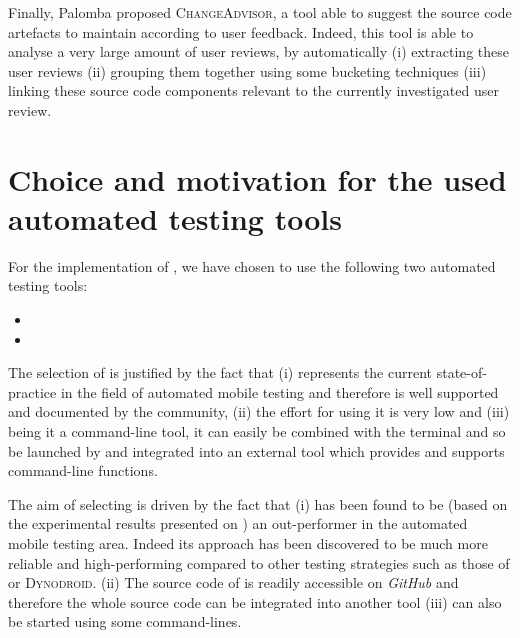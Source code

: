 Finally, Palomba \etal \cite{Palomba2017} proposed \textsc{ChangeAdvisor}, a tool able to suggest the source code artefacts to maintain according to user feedback.
Indeed, this tool is able to analyse a very large amount of user reviews, by automatically (i) extracting these user reviews (ii) grouping them together using some bucketing techniques (iii) linking these source code components relevant to the currently investigated user review.




\section{Choice and motivation for the used automated testing tools}
\label{sec:choicetool}
For the implementation of \toolname, we have chosen to use the following two automated testing tools: 
\begin{itemize}
\item \monkey
\item \sapienz
\end{itemize}
The selection of \monkey is justified by the fact that (i) \monkey represents the current state-of-practice in the field of automated mobile testing \cite{evodroid} and therefore is well supported and documented by the community, (ii) the effort for using it is very low \cite{areWeThereYet}  and (iii) being it a command-line tool, it can easily be combined with the terminal and so be launched by and integrated into an external tool which provides and supports command-line functions.  

The aim of selecting \sapienz is driven by the fact that (i) \sapienz has been found to be (based on the experimental results presented on \cite{sapienz}) an out-performer in the automated mobile testing area. Indeed its approach has been discovered to be much more reliable and high-performing compared to other testing strategies such as those of \monkey or \textsc{Dynodroid}. (ii) The source code of \sapienz is readily accessible on \textit{GitHub} and therefore the whole source code can be integrated into another tool (iii) \sapienz can also be started using some command-lines. 










